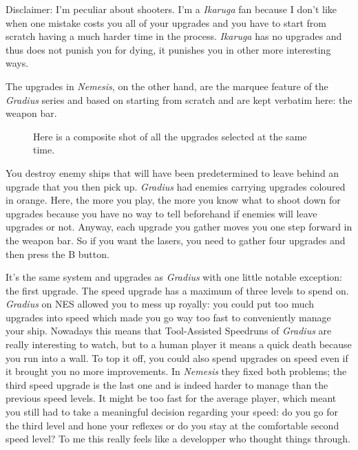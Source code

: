 \documentclass{book}
\begin{document}
Disclaimer: I’m peculiar about shooters. I’m a \emph{Ikaruga} fan because I don’t like when one mistake costs you all of your upgrades and you have to start from scratch having a much harder time in the process. \emph{Ikaruga} has no upgrades and thus does not punish you for dying, it punishes you in other more interesting ways.\par
The upgrades in \emph{Nemesis}, on the other hand, are the marquee feature of the \emph{Gradius} series and based on starting from scratch and are kept verbatim here: the weapon bar.\par
\FloatBarrier\vspace{\baselineskip}\begin{figure}[H]\caption*{Here is a composite shot of all the upgrades selected at the same time.}\end{figure}
You destroy enemy ships that will have been predetermined to leave behind an upgrade that you then pick up. \emph{Gradius} had enemies carrying upgrades coloured in orange. Here, the more you play, the more you know what to shoot down for upgrades because you have no way to tell beforehand if enemies will leave upgrades or not. Anyway, each upgrade you gather moves you one step forward in the weapon bar. So if you want the lasers, you need to gather four upgrades and then press the B button.\par
It’s the same system and upgrades as \emph{Gradius} with one little notable exception: the first upgrade. The speed upgrade has a maximum of three levels to spend on. \emph{Gradius} on NES allowed you to mess up royally: you could put too much upgrades into speed which made you go way too fast to conveniently manage your ship. Nowadays this means that Tool-Assisted Speedruns of \emph{Gradius} are really interesting to watch, but to a human player it means a quick death because you run into a wall. To top it off, you could also spend upgrades on speed even if it brought you no more improvements. In \emph{Nemesis} they fixed both problems; the third speed upgrade is the last one and is indeed harder to manage than the previous speed levels. It might be too fast for the average player, which meant you still had to take a meaningful decision regarding your speed: do you go for the third level and hone your reflexes or do you stay at the comfortable second speed level? To me this really feels like a developper who thought things through.\par
\FloatBarrier\vspace{\baselineskip}\centering
\end{document}

